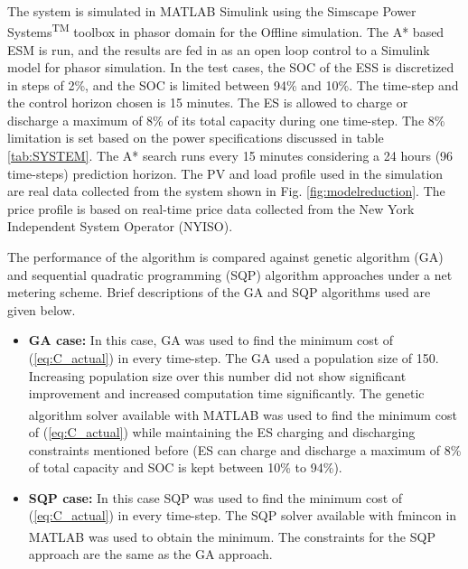 The system is simulated in MATLAB\textsuperscript{\textregistered} Simulink\textsuperscript{\textregistered} using the Simscape Power Systems\textsuperscript{TM} toolbox in phasor domain for the Offline simulation. The A* based ESM is run, and the results are fed in as an open loop control to a Simulink model for phasor simulation. In the test cases, the  SOC of the ESS is discretized in steps of 2\%, and the SOC is limited between  94\%  and  10\%. The time-step and the control horizon chosen is 15 minutes. The ES is allowed to charge or discharge a maximum of 8\% of its total capacity during one time-step. The 8\% limitation is set based on the power specifications discussed in table \ref{tab:SYSTEM}. The A* search runs every 15 minutes considering a 24 hours (96 time-steps) prediction horizon. The PV and load profile used in the simulation are real data collected from the system shown in Fig. \ref{fig:modelreduction}. The price profile is based on real-time price data collected from the New York Independent System Operator (NYISO).




The performance of the algorithm is compared against genetic algorithm (GA) and sequential quadratic programming (SQP) algorithm approaches under a net metering scheme. Brief descriptions of the GA and SQP algorithms used are given below.
\begin{itemize}
    \item \textbf{GA case:} In this case, GA was used to find the minimum cost of (\ref{eq:C_actual}) in every time-step. The GA used a population size of 150. Increasing population size over this number did not show significant improvement and increased computation time significantly. The genetic algorithm solver available with MATLAB\textsuperscript{\textregistered} \cite{GA} was used to find the minimum cost of  (\ref{eq:C_actual}) while maintaining the ES charging and discharging constraints mentioned before (ES can charge and discharge a maximum of 8\% of total capacity and SOC is kept between 10\% to 94\%).
    
    \item \textbf{SQP case:} In this case SQP was used to find the minimum cost of (\ref{eq:C_actual}) in every time-step. The SQP solver available with fmincon in  MATLAB\textsuperscript{\textregistered} was used to obtain the minimum. The constraints for the SQP approach are the same as the GA approach.

\end{itemize}

